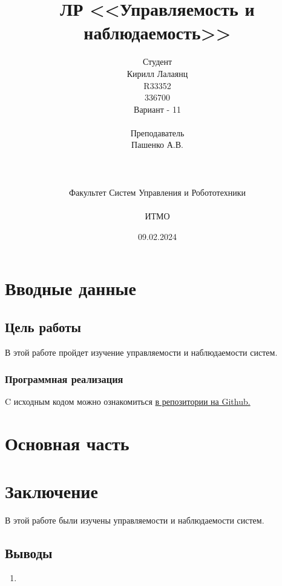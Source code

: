 \documentclass[16pt]{article}
\title{ЛР \textnumero 7 <<Управляемость и наблюдаемость>>}
\author{
Студент \\
Кирилл Лалаянц\\
R33352\\
336700\\
Вариант - 11\\
\\
Преподаватель\\
Пашенко А.В. \\
\\
\\
\\
Факультет Систем Управления и Робототехники\\
\\
ИТМО\\
}
\date{09.02.2024}
\begin{document}
\maketitle
\newpage
\tableofcontents
\thispagestyle{empty}

\newpage
\setcounter{page}{1}
\section{Вводные данные}
\subsection{Цель работы}
В этой работе пройдет изучение управляемости и наблюдаемости систем.


\subsubsection{Программная реализация}
C исходным кодом можно ознакомиться \href{https://github.com/lalayants/control-theory-itmo-2023-2024}{в репозитории на Github.}
\newpage
\section{Основная часть}


\newpage


% 


% 

\newpage
\section{Заключение}
В этой работе были изучены управляемости и наблюдаемости систем.
\subsection{Выводы}
\begin{enumerate}
   \item 
\end{enumerate}
\end{document}
